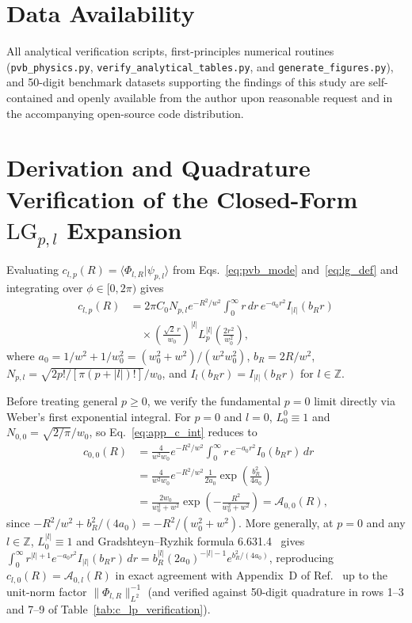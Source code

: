 \documentclass[aps,pra,onecolumn,notitlepage,11pt,tightenlines,nofootinbib,floatfix,longbibliography]{revtex4-2}
\theoremstyle{remark}
\newcommand{\braket}[2]{\langle #1 | #2 \rangle}
\newcommand{\norm}[1]{\lVert #1 \rVert}
\newcommand{\abs}[1]{\lvert #1 \rvert}
\begin{document}
\section*{Data Availability}
All analytical verification scripts, first-principles numerical routines (\texttt{pvb\_\allowbreak physics.py}, \texttt{verify\_\allowbreak analytical\_\allowbreak tables.py}, and \texttt{generate\_\allowbreak figures.py}), and 50-digit benchmark datasets supporting the findings of this study are self-contained and openly available from the author upon reasonable request and in the accompanying open-source code distribution.

\appendix

\section{Derivation and Quadrature Verification of the Closed-Form \texorpdfstring{$\mathrm{LG}_{p,l}$}{LG\_\{p,l\}} Expansion}
\label{app:lg_expansion}

Evaluating $c_{l,p}(R) = \braket{\Phi_{l,R}}{\psi_{p,l}}$ from Eqs.~\eqref{eq:pvb_mode} and~\eqref{eq:lg_def} and integrating over $\phi \in [0,2\pi)$ gives
\begin{align}
c_{l,p}(R) &= 2\pi C_0 N_{p,l} e^{-R^2/w^2} \int_0^\infty r\,dr\, e^{-a_0 r^2} I_{\abs{l}}(b_R r) \nonumber \\
&\quad \times \left(\frac{\sqrt{2}\,r}{w_0}\right)^{\abs{l}} L_p^{\abs{l}}\!\left(\frac{2r^2}{w_0^2}\right),
\label{eq:app_c_int}
\end{align}
where $a_0 = 1/w^2 + 1/w_0^2 = (w_0^2+w^2)/(w^2 w_0^2)$, $b_R = 2R/w^2$, $N_{p,l} = \sqrt{2p!/[\pi(p+\abs{l})!]}/w_0$, and $I_l(b_R r) = I_{\abs{l}}(b_R r)$ for $l \in \mathbb{Z}$.

Before treating general $p \ge 0$, we verify the fundamental $p = 0$ limit directly via Weber's first exponential integral. For $p = 0$ and $l = 0$, $L_0^0 \equiv 1$ and $N_{0,0} = \sqrt{2/\pi}/w_0$, so Eq.~\eqref{eq:app_c_int} reduces to
\begin{align}
c_{0,0}(R) &= \frac{4}{w^2 w_0} e^{-R^2/w^2} \int_0^\infty r\,e^{-a_0 r^2} I_0(b_R r)\,dr \nonumber \\
&= \frac{4}{w^2 w_0} e^{-R^2/w^2} \frac{1}{2a_0} \exp\!\left(\frac{b_R^2}{4a_0}\right) \nonumber \\
&= \frac{2w_0}{w_0^2 + w^2} \exp\!\left(-\frac{R^2}{w_0^2 + w^2}\right) = \mathcal{A}_{0,0}(R),
\label{eq:app_p0_l0_check}
\end{align}
since $-R^2/w^2 + b_R^2/(4a_0) = -R^2/(w_0^2 + w^2)$. More generally, at $p = 0$ and any $l \in \mathbb{Z}$, $L_0^{\abs{l}} \equiv 1$ and Gradshteyn--Ryzhik formula 6.631.4~\cite{Gradshteyn2014} gives $\int_0^\infty r^{\abs{l}+1} e^{-a_0 r^2} I_{\abs{l}}(b_R r)\,dr = b_R^{\abs{l}} (2 a_0)^{-\abs{l}-1} e^{b_R^2/(4a_0)}$, reproducing $c_{l,0}(R) = \mathcal{A}_{0,l}(R)$ in exact agreement with Appendix~D of Ref.~\cite{Ferreira2026} up to the unit-norm factor $\norm{\Phi_{l,R}}_{L^2}^{-1}$ (and verified against 50-digit quadrature in rows 1--3 and 7--9 of Table~\ref{tab:c_lp_verification}).
\end{document}

